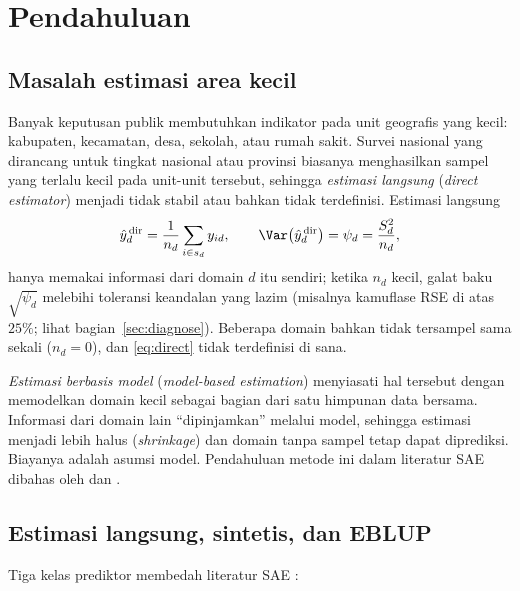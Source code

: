 \section{Pendahuluan}\label{sec:intro}

\subsection{Masalah estimasi area kecil}

Banyak keputusan publik membutuhkan indikator pada unit geografis yang kecil:
kabupaten, kecamatan, desa, sekolah, atau rumah sakit. Survei nasional yang
dirancang untuk tingkat nasional atau provinsi biasanya menghasilkan sampel yang
terlalu kecil pada unit-unit tersebut, sehingga \emph{estimasi langsung}
(\emph{direct estimator}) menjadi tidak stabil atau bahkan tidak terdefinisi.
Estimasi langsung
\begin{equation}
  \hat y_d^{\,\mathrm{dir}}=\frac{1}{n_d}\sum_{i\in s_d} y_{id},
  \qquad
  \Var\!\left(\hat y_d^{\,\mathrm{dir}}\right)=\psi_d=\frac{S_d^2}{n_d},
  \label{eq:direct}
\end{equation}
hanya memakai informasi dari domain $d$ itu sendiri; ketika $n_d$ kecil, galat
baku $\sqrt{\psi_d}$ melebihi toleransi keandalan yang lazim (misalnya
kamuflase RSE di atas $25\%$; lihat bagian~\ref{sec:diagnose}). Beberapa domain
bahkan tidak tersampel sama sekali ($n_d=0$), dan \eqref{eq:direct} tidak
terdefinisi di sana.

\emph{Estimasi berbasis model} (\emph{model-based estimation}) menyiasati hal
tersebut dengan memodelkan domain kecil sebagai bagian dari satu himpunan data
bersama. Informasi dari domain lain ``dipinjamkan'' melalui model, sehingga
estimasi menjadi lebih halus (\emph{shrinkage}) dan domain tanpa sampel tetap
dapat diprediksi. Biayanya adalah asumsi model. Pendahuluan metode ini dalam
literatur SAE dibahas oleh \citet{pfeffermann2013new} dan
\citet{rao2015small}.

\subsection{Estimasi langsung, sintetis, dan EBLUP}

Tiga kelas prediktor membedah literatur SAE \citep{rao2015small}:

